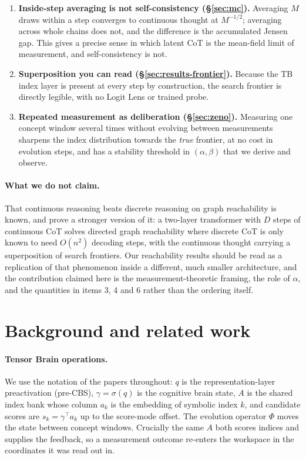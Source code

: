 \documentclass[11pt]{article}
\theoremstyle{definition}
\newcommand{\CBS}{\gamma}
\newcommand{\Ev}{\Phi}
\begin{document}
\begin{enumerate}
\item \textbf{Inside-step averaging is not self-consistency (\S\ref{sec:mc}).}
Averaging $M$ draws within a step converges to continuous thought at $M^{-1/2}$;
averaging across whole chains does not, and the difference is the accumulated
Jensen gap. This gives a precise sense in which latent CoT is the mean-field limit
of measurement, and self-consistency is not.

\item \textbf{Superposition you can read (\S\ref{sec:results-frontier}).} Because
the TB index layer is present at every step by construction, the search frontier is
directly legible, with no Logit Lens or trained probe.

\item \textbf{Repeated measurement as deliberation (\S\ref{sec:zeno}).} Measuring
one concept window several times without evolving between measurements sharpens the
index distribution towards the \emph{true} frontier, at no cost in evolution steps,
and has a stability threshold in $(\alpha,\beta)$ that we derive and observe.
\end{enumerate}

\paragraph{What we do not claim.} That continuous reasoning beats discrete
reasoning on graph reachability is known, and \citet{zhu2025superposition} prove
a stronger version of it: a two-layer transformer with $D$ steps of continuous CoT
solves directed graph reachability where discrete CoT is only known to need $O(n^2)$
decoding steps, with the continuous thought carrying a superposition of search
frontiers. Our reachability results should be read as a replication of that
phenomenon inside a different, much smaller architecture, and the contribution
claimed here is the measurement-theoretic framing, the role of $\alpha$, and the
quantities in items 3, 4 and 6 rather than the ordering itself.

\section{Background and related work}

\paragraph{Tensor Brain operations.} We use the notation of the papers throughout:
$q$ is the representation-layer preactivation (pre-CBS), $\CBS = \sigma(q)$ is the
cognitive brain state, $A$ is the shared index bank whose column $a_k$ is the
embedding of symbolic index $k$, and candidate scores are
$s_k = \CBS^{\top} a_k$ up to the score-mode offset. The evolution operator $\Ev$
moves the state between concept windows. Crucially the same $A$ both scores indices
and supplies the feedback, so a measurement outcome re-enters the workspace in the
coordinates it was read out in.
\end{document}
